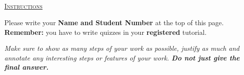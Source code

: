 \documentclass[twoside]{article}
\theoremstyle{mystyle}
\begin{document}
\begin{center}
\section*{}
\vspace{0.1in}
\large \underline{\textsc{Instructions}}
\vspace{0.1in}
\normalsize

Please write your \textbf{Name and Student Number} at the top of this page.\\

\textbf{Remember:} you have to write quizzes in your \textbf{registered} tutorial.
\vspace{0.1in}
\end{center}


\begin{center}
\textit{Make sure to show as many steps of your work as possible, justify as much and annotate any interesting steps or features of your work.  \textbf{Do not just give the final answer.}} \\
\end{center}
\end{document}

